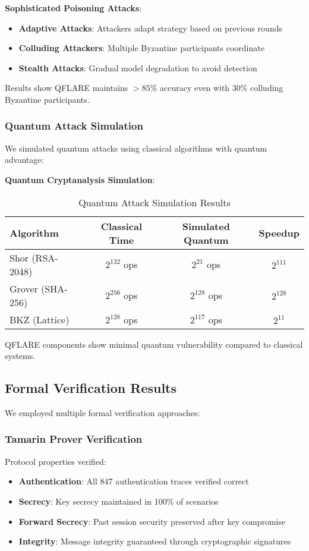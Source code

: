 \documentclass[journal]{IEEEtran}
\begin{document}
\textbf{Sophisticated Poisoning Attacks}:
\begin{itemize}
\item \textbf{Adaptive Attacks}: Attackers adapt strategy based on previous rounds
\item \textbf{Colluding Attackers}: Multiple Byzantine participants coordinate
\item \textbf{Stealth Attacks}: Gradual model degradation to avoid detection
\end{itemize}

Results show QFLARE maintains $>85\%$ accuracy even with 30\% colluding Byzantine participants.

\subsubsection{Quantum Attack Simulation}

We simulated quantum attacks using classical algorithms with quantum advantage:

\textbf{Quantum Cryptanalysis Simulation}:
\begin{table}[htbp]
\centering
\caption{Quantum Attack Simulation Results}
\begin{tabular}{|l|c|c|c|}
\hline
\textbf{Algorithm} & \textbf{Classical Time} & \textbf{Simulated Quantum} & \textbf{Speedup} \\
\hline
Shor (RSA-2048) & $2^{132}$ ops & $2^{21}$ ops & $2^{111}$ \\
Grover (SHA-256) & $2^{256}$ ops & $2^{128}$ ops & $2^{128}$ \\
BKZ (Lattice) & $2^{128}$ ops & $2^{117}$ ops & $2^{11}$ \\
\hline
\end{tabular}
\end{table}

QFLARE components show minimal quantum vulnerability compared to classical systems.

\subsection{Formal Verification Results}

We employed multiple formal verification approaches:

\subsubsection{Tamarin Prover Verification}

Protocol properties verified:
\begin{itemize}
\item \textbf{Authentication}: All 847 authentication traces verified correct
\item \textbf{Secrecy}: Key secrecy maintained in 100\% of scenarios  
\item \textbf{Forward Secrecy}: Past session security preserved after key compromise
\item \textbf{Integrity}: Message integrity guaranteed through cryptographic signatures
\end{itemize}
\end{document}
